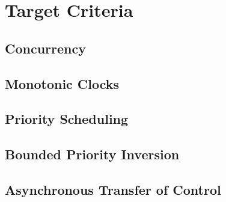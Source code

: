 \section{Target Criteria}

\subsection{Concurrency}

\subsection{Monotonic Clocks}

\subsection{Priority Scheduling}

\subsection{Bounded Priority Inversion}

\subsection{Asynchronous Transfer of Control}
